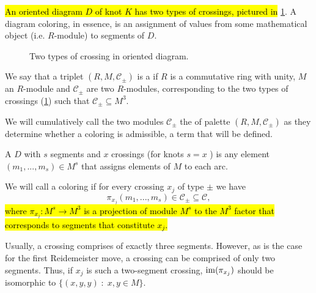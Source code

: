 \hl{An oriented diagram $D$ of knot $K$ has two types of crossings, pictured in} \cref{crossing_type}. A diagram coloring, in essence, is an assignment of values from some mathematical object (i.e. $R$-module) to segments of $D$.

\begin{figure}[h]\centering
  \caption{Two types of crossing in oriented diagram.\label{crossing_type}}
\end{figure}

\begin{definition}[palette]
  We say that a triplet {\boldmath$(R, M, \mathcal{C}_\pm)$} is a  if $R$ is a commutative ring with unity, $M$ an $R$-module and $\mathcal{C}_\pm$ are two $R$-modules, corresponding to the two types of crossings (\cref{crossing_type}) such that $\mathcal{C}_\pm\subseteq M^3$.
\end{definition}

We will cumulatively call the two modules $\mathcal{C}_\pm$ the  of palette $(R, M, \mathcal{C}_\pm)$ as they determine whether a coloring is admissible, a term that will be defined.

\begin{definition}
  A  $D$ with $s$ segments and $x$ crossings (for knots $s=x$ \cite{julia_private}) is any element $(m_1,..., m_s)\in M^s$ that assigns elements of $M$ to each arc. 

  We will call a coloring  if for every crossing $x_j$ of type $\pm$ we have 
  $$\pi_{x_j}(m_1,..., m_s)\in \mathcal{C}_\pm\subseteq\mathcal{C},$$
\hl{where $\pi_{x_j}:M^s\to M^3$ is a projection of module $M^s$ to the $M^3$ factor that corresponds to segments that constitute $x_j$.} 
\end{definition}

Usually, a crossing comprises of exactly three segments. However, as is the case for the first Reidemeister move, a crossing can be comprised of only two segments. Thus, if $x_j$ is such a two-segment crossing, $\operatorname{im}(\pi_{x_j})$ should be isomorphic to $\{(x, y, y)\;:\;x,y\in M\}$.


